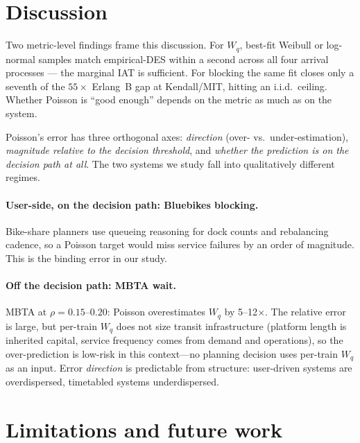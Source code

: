 \section{Discussion}\label{sec:discussion}

Two metric-level findings frame this discussion. For $W_q$, best-fit Weibull or log-normal samples match empirical-DES within a second across all four arrival processes --- the marginal IAT is sufficient. For blocking the same fit closes only a seventh of the $55\times$ Erlang~B gap at Kendall/MIT, hitting an i.i.d.\ ceiling. Whether Poisson is ``good enough'' depends on the metric as much as on the system.

Poisson's error has three orthogonal axes: \emph{direction} (over- vs.\ under-estimation), \emph{magnitude relative to the decision threshold}, and \emph{whether the prediction is on the decision path at all}. The two systems we study fall into qualitatively different regimes.

\paragraph{User-side, on the decision path: Bluebikes blocking.} Bike-share planners use queueing reasoning for dock counts and rebalancing cadence, so a Poisson target would miss service failures by an order of magnitude. This is the binding error in our study.

\paragraph{Off the decision path: MBTA wait.} MBTA at $\rho = 0.15$--$0.20$: Poisson overestimates $W_q$ by 5--12$\times$. The relative error is large, but per-train $W_q$ does not size transit infrastructure (platform length is inherited capital, service frequency comes from demand and operations), so the over-prediction is low-risk in this context---no planning decision uses per-train $W_q$ as an input. Error \emph{direction} is predictable from structure: user-driven systems are overdispersed, timetabled systems underdispersed.

\section{Limitations and future work}\label{sec:limitations}


